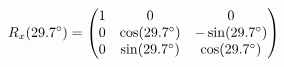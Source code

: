 \documentclass[preview]{standalone}
\begin{document}
\begin{align*}
\special{dvisvgm:raw <g id='unique000'>}R_x(29.7^\circ) = \begin{pmatrix} 1 & 0 & 0 \\ 0 & \cos(29.7^\circ) & -\sin(29.7^\circ) \\ 0 & \sin(29.7^\circ) & \cos(29.7^\circ) \end{pmatrix}\special{dvisvgm:raw </g>}
\end{align*}
\end{document}
